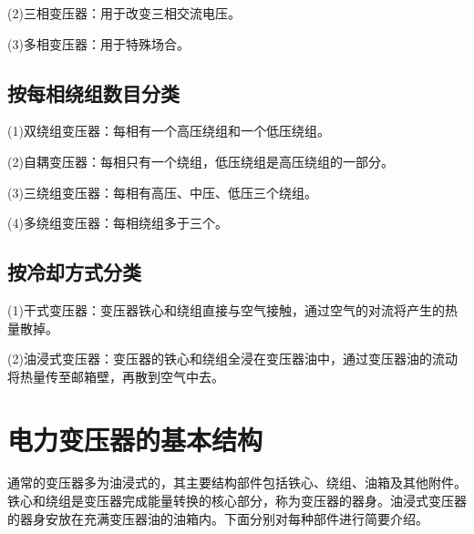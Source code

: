 \documentclass{book}
\begin{document}
(2)三相变压器：用于改变三相交流电压。

(3)多相变压器：用于特殊场合。
\subsection{按每相绕组数目分类}
(1)双绕组变压器：每相有一个高压绕组和一个低压绕组。

(2)自耦变压器：每相只有一个绕组，低压绕组是高压绕组的一部分。

(3)三绕组变压器：每相有高压、中压、低压三个绕组。

(4)多绕组变压器：每相绕组多于三个。
\subsection{按冷却方式分类}
(1)干式变压器：变压器铁心和绕组直接与空气接触，通过空气的对流将产生的热量散掉。

(2)油浸式变压器：变压器的铁心和绕组全浸在变压器油中，通过变压器油的流动将热量传至邮箱壁，再散到空气中去。

\section{电力变压器的基本结构}
通常的变压器多为油浸式的，其主要结构部件包括铁心、绕组、油箱及其他附件。铁心和绕组是变压器完成能量转换的核心部分，称为变压器的器身。油浸式变压器的器身安放在充满变压器油的油箱内。下面分别对每种部件进行简要介绍。
\end{document}
